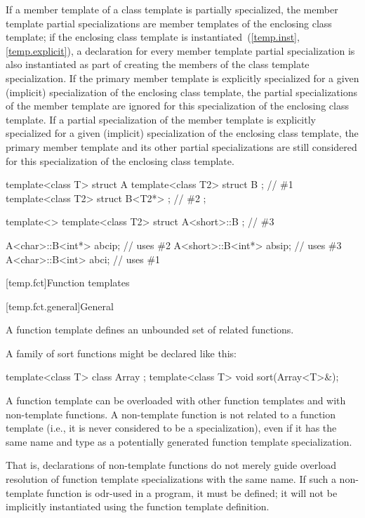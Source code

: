 \pnum
If a member template of a class template is partially specialized,
the member template partial specializations are member templates of
the enclosing class template;
if the enclosing class template is instantiated~(\ref{temp.inst}, \ref{temp.explicit}),
a declaration for every member template partial specialization is also
instantiated as part of creating the members of the class template
specialization.
If the primary member template is explicitly specialized for a given
(implicit) specialization of the enclosing class template,
the partial specializations of the member template are ignored for this
specialization of the enclosing class template.
If a partial specialization of the member template is explicitly specialized
for a given (implicit) specialization of the enclosing class template,
the primary member template and its other partial specializations are
still considered for this specialization of the enclosing class template.
\begin{example}
\begin{codeblock}
template<class T> struct A {
  template<class T2> struct B {};                               // \#1
  template<class T2> struct B<T2*> {};                          // \#2
};

template<> template<class T2> struct A<short>::B {};            // \#3

A<char>::B<int*>  abcip;                                        // uses \#2
A<short>::B<int*> absip;                                        // uses \#3
A<char>::B<int>  abci;                                          // uses \#1
\end{codeblock}
\end{example}

[temp.fct]{Function templates}

[temp.fct.general]{General}

\pnum
A function template defines an unbounded set of related functions.
\begin{example}
A family of sort functions might be declared like this:

\begin{codeblock}
template<class T> class Array { };
template<class T> void sort(Array<T>&);
\end{codeblock}
\end{example}

\pnum
A function template can be overloaded with other function templates
and with non-template functions.
A non-template function is not
related to a function template
(i.e., it is never considered to be a specialization),
even if it has the same name and type
as a potentially generated function template specialization.
\begin{footnote}
That is,
declarations of non-template functions do not merely guide
overload resolution of
function template specializations
with the same name.
If such a non-template function is odr-used in a program, it must be defined;
it will not be implicitly instantiated using the function template definition.
\end{footnote}

